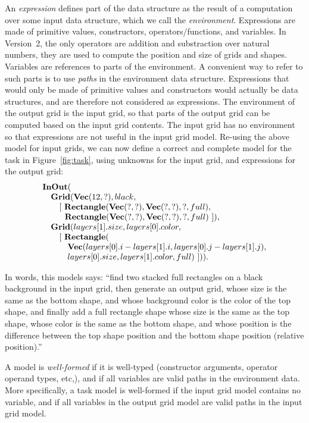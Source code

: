 \documentclass[a4paper]{llncs}
\begin{document}
An {\em expression} defines part of the data structure as the result
of a computation over some input data structure, which we call the
{\em environment}. Expressions are made of primitive values,
constructors, operators/functions, and variables. In Version~2, the
only operators are addition and substraction over natural numbers,
they are used to compute the position and size of grids and shapes.
Variables are references to parts of the environment. A convenient way
to refer to such parts is to use {\em paths} in the environment data
structure.
%
Expressions that would only be made of primitive values and
constructors would actually be data structures, and are therefore not
considered as expressions.
%
The environment of the output grid is the input grid, so that parts of
the output grid can be computed based on the input grid contents. The
input grid has no environment so that expressions are not useful in
the input grid model.
%
Re-using the above model for input grids, we can now define a correct
and complete model for the task in Figure~\ref{fig:task}, using
unknowns for the input grid, and expressions for the output grid:
\[\begin{array}{l}
    {\bf InOut}( \\
    \quad {\bf Grid}({\bf Vec}(12,?), black,\\
    \quad \quad [~{\bf Rectangle}({\bf Vec}(?,?), {\bf Vec}(?, ?), ?, full),\\
    \quad \quad ~~{\bf Rectangle}({\bf Vec}(?,?), {\bf Vec}(?, ?), ?, full)~]), \\
    \quad {\bf Grid}(layers[1].size, layers[0].color, \\
    \quad \quad [~ {\bf Rectangle}(\\
    \quad \quad \quad {\bf Vec}(layers[0].i - layers[1].i, layers[0].j - layers[1].j), \\
    \quad \quad \quad layers[0].size, layers[1].color, full) ~])).
  \end{array} \]

In words, this models says: ``find two stacked full rectangles on a
black background in the input grid, then generate an output grid,
whose size is the same as the bottom shape, and whose background color
is the color of the top shape, and finally add a full rectangle shape
whose size is the same as the top shape, whose color is the same as
the bottom shape, and whose position is the difference between the top
shape position and the bottom shape position (relative position).''

A model is {\em well-formed} if it is well-typed (constructor
arguments, operator operand types, etc,), and if all variables are
valid paths in the environment data. More specifically, a task model
is well-formed if the input grid model contains no variable, and if
all variables in the output grid model are valid paths in the input
grid model.
\end{document}
